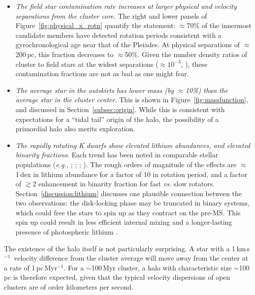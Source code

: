 \documentclass[12pt,twocolumn,tighten]{aastex63}
\newcommand{\kms}{\,km\,s$^{-1}$}
\begin{document}
\begin{itemize}
{    separation from the cluster core.}
    Figure~\ref{fig:physical_x_rotn} shows the overlap between
    kinematic and rotational cluster members used to make this
    assessment.
  \item {\it The field star contamination rate increases at larger
    physical and velocity separations from the cluster core.} The
    right and lower panels of Figure~\ref{fig:physical_x_rotn}
    quantify the statement: $\approx$70\% of the innermost
    candidate members have detected rotation periods consistent with a
    gyrochronological age near that of the Pleiades. At physical
    separations of $\approx$200\,pc, this fraction decreases to
    $\approx$50\%.  Given the number density ratios of cluster to
    field stars at the widest separations ($\approx 10^{-3}$,
    \citealt{meingast_2021}), these contamination fractions are not as
    bad as one might fear.
   \item {\it The average star in the outskirts has lower mass (by $\approx$10\%)
   than the average star in the cluster center.}
   This is shown in Figure~\ref{fig:massfunction}, and discussed in
   Section~\ref{subsec:origin}.
   While this is consistent with expectations for a
   ``tidal tail'' origin of the halo, the possibility of a primordial halo
   also merits exploration.
   \item {\it The rapidly rotating K dwarfs show elevated lithium abundances, and
     elevated binarity fractions}.  Each trend has been noted in
     comparable stellar populations ({\it e.g.,}
     \citealt{soderblom_evolution_1993};
     \citealt{meibom_effect_2007};
     \citealt{jeffries_m35_li_2020}; \citealt{gillen_ngts_2020}).  The
     rough orders of magnitude of the effects are $\approx$1\,dex in
     lithium abundance for a factor of 10 in rotation period, and a
     factor of $\gtrsim2$ enhancement in binarity fraction for fast
     {\it vs{.}} slow rotators.  
     Section~\ref{discussion:lithium} discusses one plausible
     connection between the two observations: the disk-locking
     phase may be truncated in binary systems, which could free the
     stars to spin up as they contract on the pre-MS.  This spin up
     could result in less efficient internal mixing and a
     longer-lasting presence of photospheric lithium
     \citep{eggenberger_impact_2012}.
\end{itemize}

The existence of the halo itself is not particularly surprising.  A
star with a 1\kms\ velocity difference from the cluster average will
move away from the center at a rate of 1\,pc\,Myr$^{-1}$.  For a
$\sim$100\,Myr cluster, a halo with characteristic size $\sim$100\,pc
is therefore expected, given that the typical velocity dispersions of
open clusters are of order kilometers per second.
\end{document}
